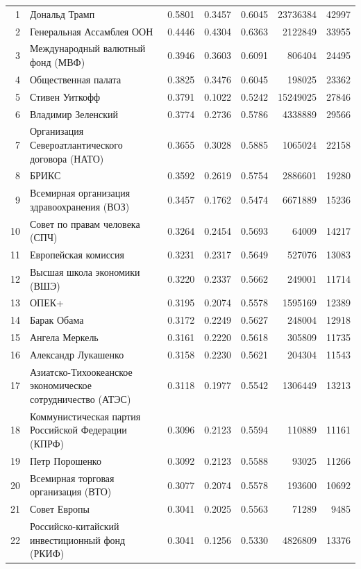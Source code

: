 {\begin{longtable}{r >{\raggedright\arraybackslash}p{4.2cm} S[table-format=1.4] S[table-format=1.4] S[table-format=1.4] r r}
1 & Дональд Трамп & 0.5801 & 0.3457 & 0.6045 & 23736384 & 42997 \\
2 & Генеральная Ассамблея ООН & 0.4446 & 0.4304 & 0.6363 & 2122849 & 33955 \\
3 & Международный валютный фонд (МВФ) & 0.3946 & 0.3603 & 0.6091 & 806404 & 24495 \\
4 & Общественная палата & 0.3825 & 0.3476 & 0.6045 & 198025 & 23362 \\
5 & Стивен Уиткофф & 0.3791 & 0.1022 & 0.5242 & 15249025 & 27846 \\
6 & Владимир Зеленский & 0.3774 & 0.2736 & 0.5786 & 4338889 & 29566 \\
7 & Организация Североатлантического договора (НАТО) & 0.3655 & 0.3028 & 0.5885 & 1065024 & 22158 \\
8 & БРИКС & 0.3592 & 0.2619 & 0.5754 & 2886601 & 19280 \\
9 & Всемирная организация здравоохранения (ВОЗ) & 0.3457 & 0.1762 & 0.5474 & 6671889 & 15236 \\
10 & Совет по правам человека (СПЧ) & 0.3264 & 0.2454 & 0.5693 & 64009 & 14217 \\
11 & Европейская комиссия & 0.3231 & 0.2317 & 0.5649 & 527076 & 13083 \\
12 & Высшая школа экономики (ВШЭ) & 0.3220 & 0.2337 & 0.5662 & 249001 & 11714 \\
13 & ОПЕК+ & 0.3195 & 0.2074 & 0.5578 & 1595169 & 12389 \\
14 & Барак Обама & 0.3172 & 0.2249 & 0.5627 & 248004 & 12918 \\
15 & Ангела Меркель & 0.3161 & 0.2220 & 0.5618 & 305809 & 11735 \\
16 & Александр Лукашенко & 0.3158 & 0.2230 & 0.5621 & 204304 & 11543 \\
17 & Азиатско-Тихоокеанское экономическое сотрудничество (АТЭС) & 0.3118 & 0.1977 & 0.5542 & 1306449 & 13213 \\
18 & Коммунистическая партия Российской Федерации (КПРФ) & 0.3096 & 0.2123 & 0.5594 & 110889 & 11161 \\
19 & Петр Порошенко & 0.3092 & 0.2123 & 0.5588 & 93025 & 11266 \\
20 & Всемирная торговая организация (ВТО) & 0.3077 & 0.2074 & 0.5578 & 193600 & 10692 \\
21 & Совет Европы & 0.3041 & 0.2025 & 0.5563 & 71289 & 9485 \\
22 & Российско-китайский инвестиционный фонд (РКИФ) & 0.3041 & 0.1256 & 0.5330 & 4826809 & 13376 \\

\end{longtable}}
